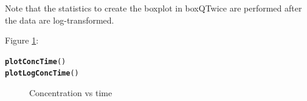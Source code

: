 \documentclass[a4paper,11pt]{article}\usepackage{graphicx, color}
\makeatletter
\newcommand{\hlfunctioncall}[1]{\textcolor[rgb]{0.501960784313725,0,0.329411764705882}{\textbf{#1}}}%
\newenvironment{kframe}{%
 \def\at@end@of@kframe{}%
 \ifinner\ifhmode%
  \def\at@end@of@kframe{\end{minipage}}%
  \begin{minipage}{\columnwidth}%
 \fi\fi%
 \def\FrameCommand##1{\hskip\@totalleftmargin \hskip-\fboxsep
 \colorbox{shadecolor}{##1}\hskip-\fboxsep
     \hskip-\linewidth \hskip-\@totalleftmargin \hskip\columnwidth}%
 \MakeFramed {\advance\hsize-\width
   \@totalleftmargin\z@ \linewidth\hsize
   \@setminipage}}%
 {\par\unskip\endMakeFramed%
 \at@end@of@kframe}
\newenvironment{knitrout}{}{} %
\makeatother
\begin{document}
Note that the statistics to create the boxplot in boxQTwice are performed after the data are log-transformed.

Figure \ref{fig:plotConcTime}:
\begin{knitrout}
\color{fgcolor}\begin{kframe}
\begin{alltt}
\hlfunctioncall{plotConcTime}()
\hlfunctioncall{plotLogConcTime}()
\end{alltt}
\end{kframe}\begin{figure}[]
\caption[Concentration vs time]{Concentration vs time\label{fig:plotConcTime}}
\end{figure}


\end{knitrout}
\end{document}
